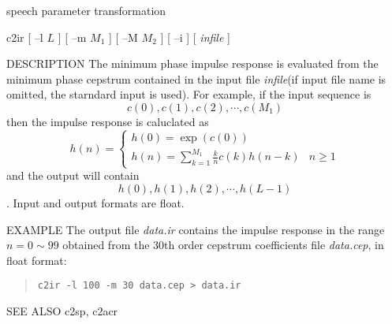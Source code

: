 %
{speech parameter transformation}

\begin{synopsis}
 \item[c2ir] [ --l $L$ ] [ --m $M_1$ ] [ --M $M_2$ ] [ --i ] [ {\em infile} ]
\end{synopsis}

\begin{qsection}{DESCRIPTION}
The minimum phase impulse response is evaluated from the minimum phase
cepstrum contained in the input file {\em infile}(if input file name
is omitted, the starndard input is used).
For example, if the input sequence is
\[c(0),c(1),c(2),\cdots,c(M_1)\]
then the impulse response is caluclated as
\[ h(n)=\left\{
\begin{array}{lc}
 h(0)=\exp(c(0))&\\
 h(n)=\displaystyle \sum_{k=1}^{M_1} \frac{k}{n}c(k)h(n-k)& n \geq 1
\end{array}
\right. \]
and the output will contain
\[ h(0),h(1),h(2),\cdots,h(L -1) \].
Input and output formats are float.
\end{qsection}

\begin{options}
\end{options}

\begin{qsection}{EXAMPLE}
The output file {\em data.ir} contains the impulse response
in the range $n = 0 \sim 99$ obtained from the 30th order cepstrum
coefficients file {\em data.cep}, in float format:
 \begin{quote}
  \verb!c2ir -l 100 -m 30 data.cep > data.ir!
 \end{quote}
\end{qsection}

\begin{qsection}{SEE ALSO}
 c2sp, c2acr
\end{qsection}
